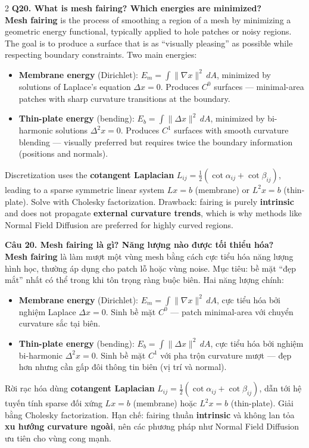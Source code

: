 \begin{paracol}{2}
\textbf{Q20. What is mesh fairing? Which energies are minimized?}\\
\textbf{Mesh fairing} is the process of smoothing a region of a mesh by minimizing a geometric energy functional, typically applied to hole patches or noisy regions. The goal is to produce a surface that is as ``visually pleasing'' as possible while respecting boundary constraints. Two main energies:
\begin{itemize}[leftmargin=*,nosep]
\item \textbf{Membrane energy} (Dirichlet): $E_m = \int \|\nabla x\|^2 \,dA$, minimized by solutions of Laplace's equation $\Delta x = 0$. Produces $C^0$ surfaces — minimal-area patches with sharp curvature transitions at the boundary.
\item \textbf{Thin-plate energy} (bending): $E_b = \int \|\Delta x\|^2 \,dA$, minimized by bi-harmonic solutions $\Delta^2 x = 0$. Produces $C^1$ surfaces with smooth curvature blending — visually preferred but requires twice the boundary information (positions and normals).
\end{itemize}
Discretization uses the \textbf{cotangent Laplacian} $L_{ij} = \frac{1}{2}(\cot\alpha_{ij} + \cot\beta_{ij})$, leading to a sparse symmetric linear system $L x = b$ (membrane) or $L^2 x = b$ (thin-plate). Solve with Cholesky factorization. Drawback: fairing is purely \textbf{intrinsic} and does not propagate \textbf{external curvature trends}, which is why methods like Normal Field Diffusion are preferred for highly curved regions.

\switchcolumn

\textbf{Câu 20. Mesh fairing là gì? Năng lượng nào được tối thiểu hóa?}\\
\textbf{Mesh fairing} là làm mượt một vùng mesh bằng cách cực tiểu hóa năng lượng hình học, thường áp dụng cho patch lỗ hoặc vùng noise. Mục tiêu: bề mặt ``đẹp mắt'' nhất có thể trong khi tôn trọng ràng buộc biên. Hai năng lượng chính:
\begin{itemize}[leftmargin=*,nosep]
\item \textbf{Membrane energy} (Dirichlet): $E_m = \int \|\nabla x\|^2 \,dA$, cực tiểu hóa bởi nghiệm Laplace $\Delta x = 0$. Sinh bề mặt $C^0$ — patch minimal-area với chuyển curvature sắc tại biên.
\item \textbf{Thin-plate energy} (bending): $E_b = \int \|\Delta x\|^2 \,dA$, cực tiểu hóa bởi nghiệm bi-harmonic $\Delta^2 x = 0$. Sinh bề mặt $C^1$ với pha trộn curvature mượt — đẹp hơn nhưng cần gấp đôi thông tin biên (vị trí và normal).
\end{itemize}
Rời rạc hóa dùng \textbf{cotangent Laplacian} $L_{ij} = \frac{1}{2}(\cot\alpha_{ij} + \cot\beta_{ij})$, dẫn tới hệ tuyến tính sparse đối xứng $L x = b$ (membrane) hoặc $L^2 x = b$ (thin-plate). Giải bằng Cholesky factorization. Hạn chế: fairing thuần \textbf{intrinsic} và không lan tỏa \textbf{xu hướng curvature ngoài}, nên các phương pháp như Normal Field Diffusion ưu tiên cho vùng cong mạnh.


\end{paracol}
